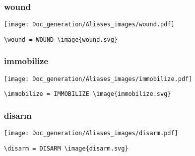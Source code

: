 \documentclass{article}
\begin{document}
\subsubsection{wound}
\begin{minipage}{0.45\linewidth}
\raggedright
\begin{spverbatim}
\wound 
\end{spverbatim}
\end{minipage}
\begin{minipage}{0.45\linewidth}
\raggedleft
\texttt{[image: Doc\_generation/Aliases\_images/wound.pdf]}
\end{minipage}
\begin{center}
\begin{BVerbatim}
\wound = WOUND \image{wound.svg}
\end{BVerbatim}
\end{center}

\subsubsection{immobilize}
\begin{minipage}{0.45\linewidth}
\raggedright
\begin{spverbatim}
\immobilize 
\end{spverbatim}
\end{minipage}
\begin{minipage}{0.45\linewidth}
\raggedleft
\texttt{[image: Doc\_generation/Aliases\_images/immobilize.pdf]}
\end{minipage}
\begin{center}
\begin{BVerbatim}
\immobilize = IMMOBILIZE \image{immobilize.svg}
\end{BVerbatim}
\end{center}

\subsubsection{disarm}
\begin{minipage}{0.45\linewidth}
\raggedright
\begin{spverbatim}
\disarm 
\end{spverbatim}
\end{minipage}
\begin{minipage}{0.45\linewidth}
\raggedleft
\texttt{[image: Doc\_generation/Aliases\_images/disarm.pdf]}
\end{minipage}
\begin{center}
\begin{BVerbatim}
\disarm = DISARM \image{disarm.svg}
\end{BVerbatim}
\end{center}
\end{document}
